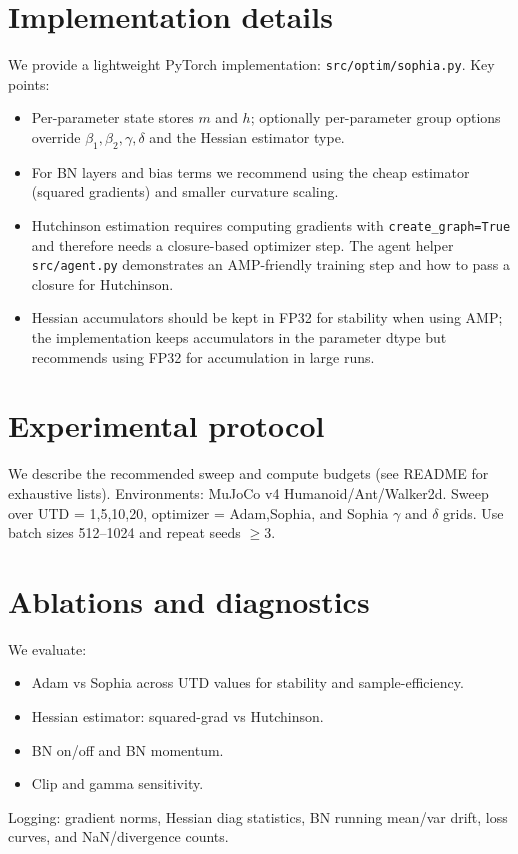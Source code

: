 \documentclass{article}
\begin{document}
\section{Implementation details}
We provide a lightweight PyTorch implementation: \texttt{src/optim/sophia.py}. Key points:
\begin{itemize}
  \item Per-parameter state stores $m$ and $h$; optionally per-parameter group options override $\beta_1,\beta_2,\gamma,\delta$ and the Hessian estimator type.
  \item For BN layers and bias terms we recommend using the cheap estimator (squared gradients) and smaller curvature scaling.
  \item Hutchinson estimation requires computing gradients with \texttt{create\_graph=True} and therefore needs a closure-based optimizer step. The agent helper \texttt{src/agent.py} demonstrates an AMP-friendly training step and how to pass a closure for Hutchinson.
  \item Hessian accumulators should be kept in FP32 for stability when using AMP; the implementation keeps accumulators in the parameter dtype but recommends using FP32 for accumulation in large runs.
\end{itemize}

\section{Experimental protocol}
We describe the recommended sweep and compute budgets (see README for exhaustive lists). Environments: MuJoCo v4 Humanoid/Ant/Walker2d. Sweep over UTD = {1,5,10,20}, optimizer = {Adam,Sophia}, and Sophia $\gamma$ and $\delta$ grids. Use batch sizes 512–1024 and repeat seeds $\ge 3$.

\section{Ablations and diagnostics}
We evaluate:
\begin{itemize}
\item Adam vs Sophia across UTD values for stability and sample-efficiency.
\item Hessian estimator: squared-grad vs Hutchinson.
\item BN on/off and BN momentum.
\item Clip and gamma sensitivity.
\end{itemize}
Logging: gradient norms, Hessian diag statistics, BN running mean/var drift, loss curves, and NaN/divergence counts.
\end{document}
